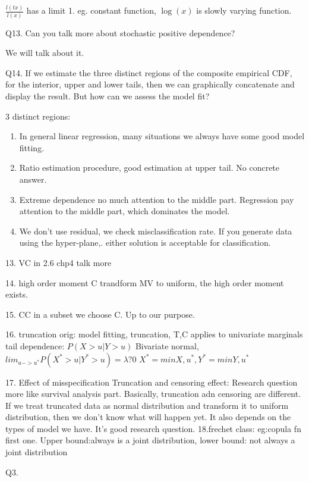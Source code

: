 \documentclass[a4paper,12pt]{texMemo}
\begin{document}
$\frac{l(tx)}{l(x)}$ has a limit 1. eg. constant function, $\log(x)$ is slowly varying function. 

Q13. Can you talk more about stochastic positive dependence?

We will talk about it. 

Q14. If we estimate the three distinct regions of the composite empirical CDF, for the interior, upper and lower tails, then we can graphically concatenate and display the result. But how can we assess the model fit?

3 distinct regions:
\begin{enumerate}
\item In general linear regression, many situations we always have some good model fitting. 
\item Ratio estimation procedure, good estimation at upper tail.
No concrete answer.
\item Extreme dependence no much attention to the middle part.
Regression pay attention to the middle part, which dominates the model. 
\item We don't use residual, we check misclassification rate. 
If you generate data using the hyper-plane,. either solution is acceptable for classification. 
\end{enumerate}
13. VC in 2.6 chp4 talk more

14. high order moment
C trandform MV to uniform, the high order moment exists.

15. CC in a subset we choose C. Up to our purpose.

16. truncation 
orig: model fitting, truncation, 
T,C applies to univariate marginals 
tail dependence: $P(X>u|Y>u)$
Bivariate normal,  $lim_{u->u^*}P(X^*>u|Y^*>u)=\lambda?0$
$X^*=min{X,u^*},Y^*=min{Y,u^*}$   

17. Effect of misspecification
Truncation and censoring effect: Research question more like survival analysis part.
Basically, truncation adn censoring are different. If we treat truncated data as normal distribution and transform it to uniform distribution, then we don't know what will happen yet. It also depends on the types of model we have. It's good research question. 
18.frechet class:
eg:copula fn 
first one. 
Upper bound:always is a joint distribution, lower bound: not always a joint distribution

Q3.
\end{document}
